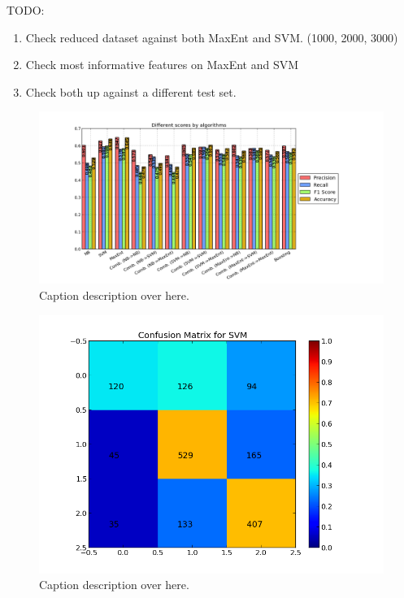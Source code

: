 TODO:
\begin{enumerate}
\item Check reduced dataset against both MaxEnt and SVM. (1000, 2000, 3000)
\item Check most informative features on MaxEnt and SVM
\item Check both up against a different test set. 
\end{enumerate}


\begin{figure}
 \begin{center}
     \includegraphics[width=\linewidth]{../img/plots/grid/full.png}
 \end{center}
 \caption[Results overview across models]{Caption description over here.}
 \label{fig:results_full}
\end{figure}


\begin{figure}[ht]
 \begin{center}
     \includegraphics[width=0.7\linewidth]{../img/plots/grid/confusion_matrix_SVM.png}
 \end{center}
 \caption[Results overview across models]{Caption description over here.}
 \label{fig:confmat_svm}
\end{figure}

